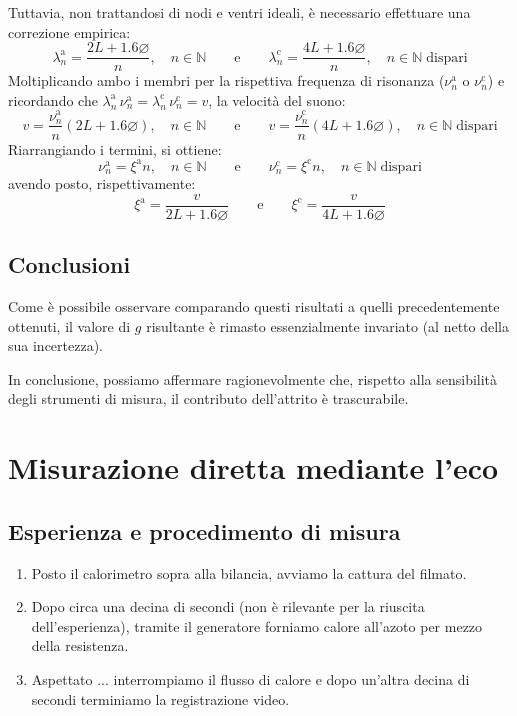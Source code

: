 \documentclass{article}
\newcommand*{\diam}{\varnothing}
\begin{document}
Tuttavia, non trattandosi di nodi e ventri ideali, è necessario effettuare
una correzione empirica:
\[
  \lambda_n^\text{a} = \frac{2L + 1.6 \diam}{n},\quad n\in\mathbb{N}
  \qquad\text{e}\qquad
  \lambda_n^\text{c} = \frac{4L + 1.6 \diam}{n},\quad n\in\mathbb{N}\;\text{dispari}
\]
Moltiplicando ambo i membri per la rispettiva frequenza di risonanza
($\nu_n^\text{a}$ o $\nu_n^\text{c}$)
e ricordando che $\lambda_n^\text{a}\,\nu_n^\text{a} =
\lambda_n^\text{c}\,\nu_n^\text{c} = v$, la velocità del suono:
\[
  v = \frac{\nu_n^\text{a}}{n}(2L + 1.6 \diam),\quad n\in\mathbb{N}
  \qquad\text{e}\qquad
  v = \frac{\nu_n^\text{c}}{n}(4L + 1.6 \diam),\quad n\in\mathbb{N}\;\text{dispari}
\]
Riarrangiando i termini, si ottiene:
\[
  \nu_n^\text{a} = \xi^\text{a} n,\quad n\in\mathbb{N}
  \qquad\text{e}\qquad
  \nu_n^\text{c} = \xi^\text{c} n,\quad n\in\mathbb{N}\;\text{dispari}
\]
avendo posto, rispettivamente:
\[
  \xi^\text{a} = \frac{v}{2L + 1.6 \diam}
  \qquad\text{e}\qquad
  \xi^\text{c} = \frac{v}{4L + 1.6 \diam}
\]


\subsection{Conclusioni}

Come è possibile osservare comparando questi risultati a
quelli precedentemente ottenuti, il valore di $g$ risultante
è rimasto essenzialmente invariato (al netto della sua incertezza).

In conclusione, possiamo affermare ragionevolmente che,
rispetto alla sensibilità degli strumenti di misura,
il contributo dell'attrito è trascurabile.

\section{Misurazione diretta mediante l'eco}

\subsection{Esperienza e procedimento di misura}

\begin{enumerate}
  \item
    Posto il calorimetro sopra alla bilancia, avviamo la cattura del filmato.
  \item
    Dopo circa una decina di secondi (non è rilevante per la riuscita dell'esperienza),
    tramite il generatore forniamo calore all'azoto per mezzo della resistenza.
  \item
    Aspettato ... interrompiamo il flusso di calore e dopo
    un'altra decina di secondi terminiamo la registrazione video.
\end{enumerate}
\end{document}
